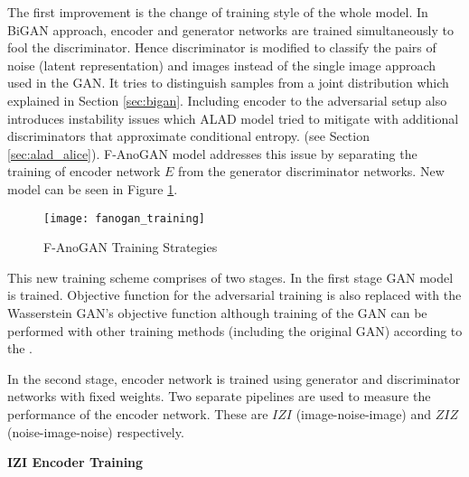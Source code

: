 {The first improvement is the change of training style of the whole model. In BiGAN approach,
encoder and generator networks are trained simultaneously to fool the discriminator. Hence discriminator is
modified to classify the pairs of noise (latent representation) and images instead of the single
image approach used in the GAN. It tries to distinguish samples from a joint
distribution which explained in Section \ref{sec:bigan}. Including encoder to the adversarial setup
also introduces instability issues which ALAD model \cite{DBLP:journals/corr/abs-1812-02288}
tried to mitigate with additional discriminators that approximate conditional entropy. (see Section
\ref{sec:alad_alice}). F-AnoGAN model addresses this issue by separating the training of
encoder network $E$ from the generator discriminator networks. New model can be seen in Figure
\ref{fig:fanogan_training}. 
\begin{figure}[h!]
	\centering
	\texttt{[image: fanogan\_training]}
	\caption{F-AnoGAN Training Strategies \cite{pub.1111824956}}
	\label{fig:fanogan_training}
\end{figure}

This new training scheme comprises of two stages. In the first stage GAN model is trained.
Objective function for the adversarial training is also replaced with the Wasserstein GAN's
objective function \cite{Arjovsky2017WassersteinG} 
although training of the GAN can be performed with other training methods (including the
original GAN) according to the \cite{pub.1111824956}.

In the second stage, encoder network is trained using generator and discriminator networks with fixed
weights. Two separate pipelines are used to measure the performance of the encoder network. These are $IZI$
(image-noise-image) and $ZIZ$ (noise-image-noise) respectively. 

\textbf{IZI Encoder Training}

}
